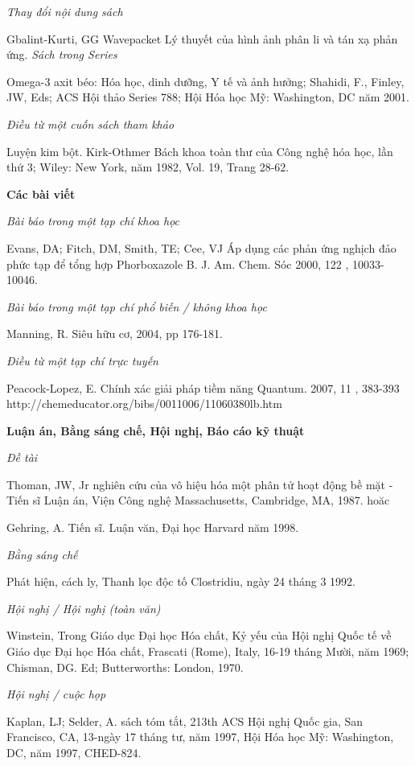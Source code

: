 \documentclass{hcmutarticle}
\begin{document}
{\em Thay đổi nội dung sách}

Gbalint-Kurti, GG Wavepacket Lý thuyết của hình ảnh phân li và tán xạ phản ứng. 
{\em Sách trong Series}

Omega-3 axit béo: Hóa học, dinh dưỡng, Y tế và ảnh hưởng; Shahidi, F., Finley, JW, Eds; ACS Hội thảo Series 788; Hội Hóa học Mỹ: Washington, DC năm 2001.

{\em Điều từ một cuốn sách tham khảo}

Luyện kim bột. Kirk-Othmer Bách khoa toàn thư của Công nghệ hóa học, lần thứ 3; Wiley: New York, năm 1982, Vol. 19, Trang 28-62.

{\bfseries Các bài viết}

{\em Bài báo trong một tạp chí khoa học}

Evans, DA; Fitch, DM, Smith, TE; Cee, VJ Áp dụng các phản ứng nghịch đảo phức tạp để tổng hợp Phorboxazole B. J. Am. Chem. Sóc 2000, 122 , 10033-10046.

{\em Bài báo trong một tạp chí phổ biến / không khoa học}

Manning, R. Siêu hữu cơ, 2004, pp 176-181.

{\em Điều từ một tạp chí trực tuyến}

Peacock-Lopez, E. Chính xác giải pháp tiềm năng Quantum. 2007, 11 , 383-393 http://chemeducator.org/bibs/0011006/11060380lb.htm 

{\bfseries Luận án, Bằng sáng chế, Hội nghị, Báo cáo kỹ thuật}

{\em Đề tài}

Thoman, JW, Jr nghiên cứu của vô hiệu hóa một phân tử hoạt động bề mặt -Tiến sĩ Luận án, Viện Công nghệ Massachusetts, Cambridge, MA, 1987.
hoăc

Gehring, A. Tiến sĩ. Luận văn, Đại học Harvard năm 1998.

{\em Bằng sáng chế}

 Phát hiện, cách ly, Thanh lọc độc tố Clostridiu, ngày 24 tháng 3 1992.

{\em Hội nghị / Hội nghị (toàn văn)}

Winstein, Trong Giáo dục Đại học Hóa chất, Kỷ yếu của Hội nghị Quốc tế về Giáo dục Đại học Hóa chất, Frascati (Rome), Italy, 16-19 tháng Mười, năm 1969; Chisman, DG. Ed; Butterworths: London, 1970.

{\em Hội nghị / cuộc họp }

Kaplan, LJ; Selder, A. sách tóm tắt, 213th ACS Hội nghị Quốc gia, San Francisco, CA, 13-ngày 17 tháng tư, năm 1997, Hội Hóa học Mỹ: Washington, DC, năm 1997, CHED-824.
\end{document}
